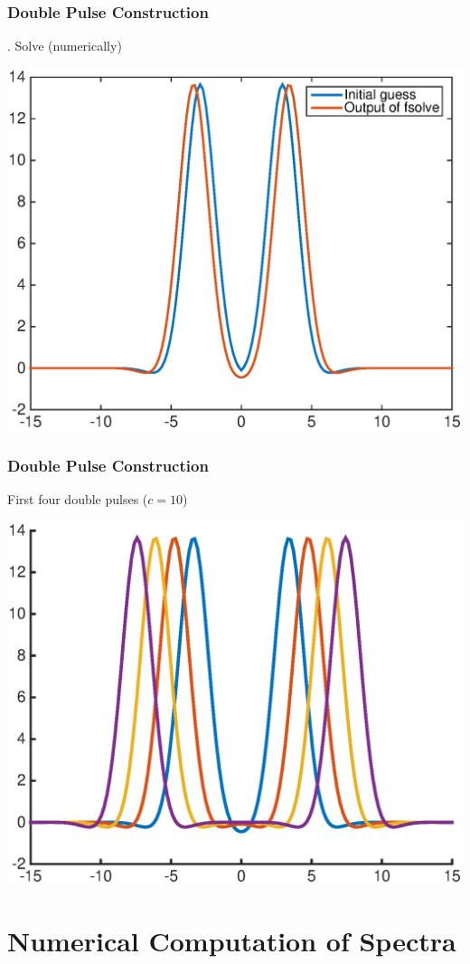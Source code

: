 \documentclass[16pt]{beamer}
\begin{document}
\begin{frame}
	\frametitle{Double Pulse Construction}
	\fontsize{16}{7.2}. Solve (numerically)
	\begin{center}
	\includegraphics[width=0.8\linewidth]{images/dp1after.eps}
	\end{center}
\end{frame}

\begin{frame}
	\frametitle{Double Pulse Construction}
	\fontsize{16}{7.2}\selectfont
	First four double pulses ($c = 10$)
	\begin{center}
	\includegraphics[width=0.8\linewidth]{images/doublepulses.eps}
	\end{center}
\end{frame}

\section{Numerical Computation of Spectra}
\end{document}
